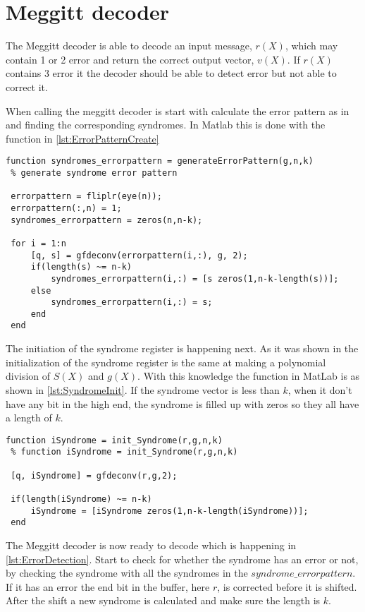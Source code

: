 \documentclass[Main]{subfiles}
\begin{document}
\section{Meggitt decoder}
The Meggitt decoder is able to decode an input message, $r(X)$, which may contain 1 or 2 error and return the correct output vector, $v(X)$.
If $r(X)$ contains 3 error it the decoder should be able to detect error but not able to correct it.

When calling the meggitt decoder is start with calculate the error pattern as in  and finding the corresponding syndromes.
In Matlab this is done with the function in \codeTitle \ref{lst:ErrorPatternCreate}

\begin{lstlisting}[caption=Error pattern creation, style=Code-Matlab, label=lst:ErrorPatternCreate]
 function syndromes_errorpattern = generateErrorPattern(g,n,k)
 % generate syndrome error pattern
 
 errorpattern = fliplr(eye(n));
 errorpattern(:,n) = 1;
 syndromes_errorpattern = zeros(n,n-k);
 
 for i = 1:n
     [q, s] = gfdeconv(errorpattern(i,:), g, 2);
     if(length(s) ~= n-k)
         syndromes_errorpattern(i,:) = [s zeros(1,n-k-length(s))];
     else
         syndromes_errorpattern(i,:) = s;
     end
 end
\end{lstlisting}

The initiation of the syndrome register is happening next.
As it was shown in  the initialization of the syndrome register is the same at making a polynomial division of $S(X)$ and $g(X)$.
With this knowledge the function in MatLab is as shown in \codeTitle \ref{lst:SyndromeInit}.
If the syndrome vector is less than $k$, when it don't have any bit in the high end, the syndrome is filled up with zeros so they all have a length of $k$.

\begin{lstlisting}[caption=Syndrome initialization, style=Code-Matlab, label=lst:SyndromeInit]
 function iSyndrome = init_Syndrome(r,g,n,k)
 % function iSyndrome = init_Syndrome(r,g,n,k)
 
 [q, iSyndrome] = gfdeconv(r,g,2);
 
 if(length(iSyndrome) ~= n-k)
     iSyndrome = [iSyndrome zeros(1,n-k-length(iSyndrome))];
 end
\end{lstlisting}

The Meggitt decoder is now ready to decode which is happening in \codeTitle \ref{lst:ErrorDetection}.
Start to check for whether the syndrome has an error or not, by checking the syndrome with all the syndromes in the $syndrome\_errorpattern$.
If it has an error the end bit in the buffer, here $r$, is corrected before it is shifted.
After the shift a new syndrome is calculated and make sure the length is $k$.
\end{document}
